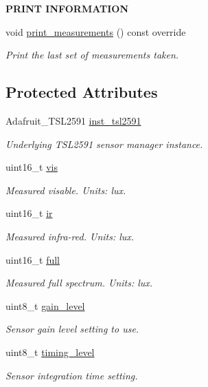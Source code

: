 \begin{Indent}{\bf P\+R\+I\+NT I\+N\+F\+O\+R\+M\+A\+T\+I\+ON}\par
\begin{DoxyCompactItemize}
\item 
void \hyperlink{class_loom___t_s_l2591_af7b92a13edb2ad1e769734d054eaeadf}{print\+\_\+measurements} () const override
\begin{DoxyCompactList}\small\item\em Print the last set of measurements taken. \end{DoxyCompactList}\end{DoxyCompactItemize}
\end{Indent}
\subsection*{Protected Attributes}
\begin{DoxyCompactItemize}
\item 
Adafruit\+\_\+\+T\+S\+L2591 \hyperlink{class_loom___t_s_l2591_a158e5d5f081b8d690c034c74d9856199}{inst\+\_\+tsl2591}
\begin{DoxyCompactList}\small\item\em Underlying T\+S\+L2591 sensor manager instance. \end{DoxyCompactList}\item 
uint16\+\_\+t \hyperlink{class_loom___t_s_l2591_a89d7af5c80c4fd1c51206e7fff0fa292}{vis}
\begin{DoxyCompactList}\small\item\em Measured visable. Units\+: lux. \end{DoxyCompactList}\item 
uint16\+\_\+t \hyperlink{class_loom___t_s_l2591_a5ff1546e2339ae92ff7166e223619b1f}{ir}
\begin{DoxyCompactList}\small\item\em Measured infra-\/red. Units\+: lux. \end{DoxyCompactList}\item 
uint16\+\_\+t \hyperlink{class_loom___t_s_l2591_a68c7142a08c2aebc03056f701a272d9b}{full}
\begin{DoxyCompactList}\small\item\em Measured full spectrum. Units\+: lux. \end{DoxyCompactList}\item 
uint8\+\_\+t \hyperlink{class_loom___t_s_l2591_ab780e3d0e00a84a01405235182821708}{gain\+\_\+level}
\begin{DoxyCompactList}\small\item\em Sensor gain level setting to use. \end{DoxyCompactList}\item 
uint8\+\_\+t \hyperlink{class_loom___t_s_l2591_a5909e1a24e7a1f15995cc001c64c70dd}{timing\+\_\+level}
\begin{DoxyCompactList}\small\item\em Sensor integration time setting. \end{DoxyCompactList}\end{DoxyCompactItemize}
